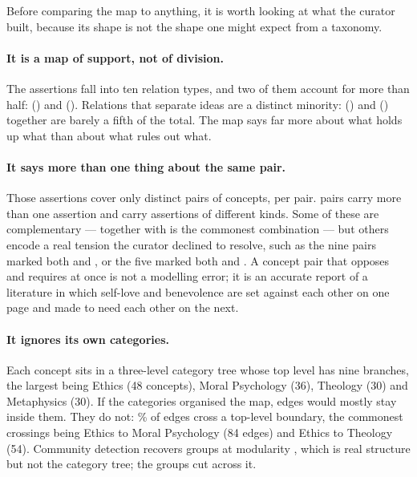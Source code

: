 Before comparing the map to anything, it is worth looking at what the curator
built, because its shape is not the shape one might expect from a taxonomy.

\paragraph{It is a map of support, not of division.}
The \NAssertions{} assertions fall into ten relation types, and two of them
account for more than half:  (\RelSupports{}) and
 (\RelRequires{}). Relations that separate ideas are a distinct
minority:  (\RelOpposes{}) and 
(\RelContrastsWith{}) together are barely a fifth of the total. The map says
far more about what holds up what than about what rules out what.

\paragraph{It says more than one thing about the same pair.}
Those \NAssertions{} assertions cover only \NPairs{} distinct pairs of
concepts, \AssertionsPerPair{} per pair. \PairsMulti{} pairs carry more than
one assertion and \PairsConflicting{} carry assertions of different kinds.
Some of these are complementary ---  together with
 is the commonest combination --- but others encode a real
tension the curator declined to resolve, such as the nine pairs marked both
 and , or the five marked both
 and . A concept pair that opposes and requires at
once is not a modelling error; it is an accurate report of a literature in
which self-love and benevolence are set against each other on one page and
made to need each other on the next.

\paragraph{It ignores its own categories.}
Each concept sits in a three-level category tree whose top level has nine
branches, the largest being Ethics (48 concepts), Moral Psychology (36),
Theology (30) and Metaphysics (30). If the categories organised the map, edges
would mostly stay inside them. They do not: \CrossCategoryPct\% of edges cross
a top-level boundary, the commonest crossings being Ethics to Moral Psychology
(84 edges) and Ethics to Theology (54). Community detection recovers
\NCommunities{} groups at modularity \Modularity{}, which is real structure
but not the category tree; the groups cut across it.

